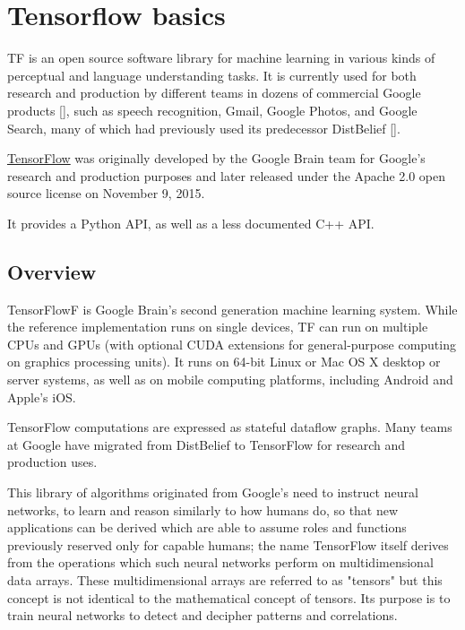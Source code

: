 \chapter{Tensorflow basics}\label{ch:tensorflow_basics}

\ac{TF} is an open source software library for machine learning in various kinds of perceptual and language understanding tasks. It is currently used for both research and production by different teams in dozens of commercial Google products [\cite{DBLP:journals/corr/AbadiABBCCCDDDG16}], such as speech recognition, Gmail, Google Photos, and Google Search, many of which had previously used its predecessor DistBelief [\cite{40565}]. 

\href{https://www.tensorflow.org/}{TensorFlow} was originally developed by the Google Brain team for Google's research and production purposes and later released under the Apache 2.0 open source license on November 9, 2015.

It provides a Python API, as well as a less documented C++ API.

\section{Overview}

TensorFlowF is Google Brain's second generation machine learning system. While the reference implementation runs on single devices, \ac{TF} can run on multiple \acsp{CPU} and \acsp{GPU} (with optional \acs{CUDA} extensions for general-purpose computing on graphics processing units). It runs on 64-bit Linux or Mac OS X desktop or server systems, as well as on mobile computing platforms, including Android and Apple's iOS.

TensorFlow computations are expressed as stateful dataflow graphs. Many teams at Google have migrated from DistBelief to TensorFlow for research and production uses.

This library of algorithms originated from Google's need to instruct neural networks, to learn and reason similarly to how humans do, so that new applications can be derived which are able to assume roles and functions previously reserved only for capable humans; the name TensorFlow itself derives from the operations which such neural networks perform on multidimensional data arrays. These multidimensional arrays are referred to as "tensors" but this concept is not identical to the mathematical concept of tensors. Its purpose is to train neural networks to detect and decipher patterns and correlations.